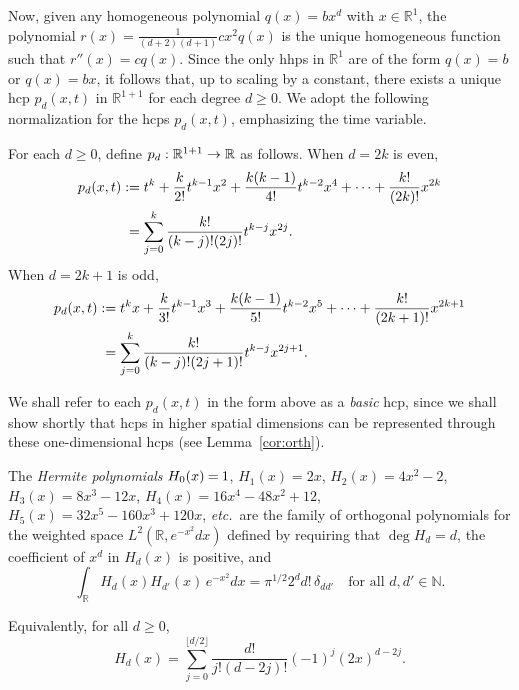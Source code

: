 \documentclass[AHL,Unicode,longabstracts,published]{cedram}
\newcommand{\N}{\mathbb{N}}
\newcommand{\R}{\mathbb{R}}
\newcommand*{\mk}{\mkern -1mu}
\newcommand*{\Mk}{\mkern -2mu}
\newcommand*{\MK}{\mkern 2mu}
\renewcommand*{\to}{\mathchoice{\longrightarrow}{\rightarrow}{\rightarrow}{\rightarrow}}
\newcommand{\R}{\mathbb{R}}
\begin{document}
Now, given any homogeneous polynomial $q(x)=bx^d$ with $x\in\R^1$, the polynomial $r(x)=\frac{1}{(d+2)(d+1)}cx^2q(x)$ is the unique homogeneous function such that $r''(x)=cq(x)$. Since the only hhps in $\R^1$ are of the form $q(x)=b$ or $q(x)=bx$, it follows that, up to scaling by a constant, there exists a unique hcp $p_d(x,t)$ in $\R^{1+1}$ for each degree $d\geq 0$. We adopt the following normalization for the hcps $p_d(x,t)$, emphasizing the time variable.

\begin{defi}\label{def:basic-p}
For each $d\geq 0$, define $p_d:\R^{1+1}\to\R$ as follows. When $d=2k$ is even,
\begin{align*}
p_{d}(x,t) \,\MK &\!\Mk:= t^k + \frac{k}{2!} t^{k-1} x^2 + \frac{k(k-1)}{4!} t^{k-2} x^4 + \dots + \frac{k!}{(2k)!} x^{2k} \\
&= \sum_{j=0}^k \frac{k!}{(k-j)! (2j)!} t^{k-j} x^{2j}.
\end{align*}
When $d=2k+1$ is odd,
\begin{align*}
p_{d}(x,t) \,\MK &\!\Mk:= t^k x + \frac{k}{3!} t^{k-1} x^3 + \frac{k(k-1)}{5!} t^{k-2} x^5 + \dots + \frac{k!}{(2k+1)!} x^{2k+1} \\
&= \sum_{j=0}^k \frac{k!}{(k-j)! (2j+1)!} t^{k-j} x^{2j+1}.
\end{align*}
\end{defi}

{We shall refer to each $p_d(x,t)$ in the form above as a \emph{basic} hcp, since we shall show shortly that hcps in higher spatial dimensions can be represented through these one-dimensional hcps (see Lemma~\ref{cor:orth}).}

\begin{defi}
\!\! The \emph{Hermite polynomials} ${H_0(x)\mk=\mk 1}$, $H_1(x)=2x$, $H_2(x)=4x^2-2$, $H_3(x)=8x^3-12x$, $H_4(x)=16x^4-48x^2+12$, $H_5(x)=32x^5-160x^3+120x$, \emph{etc.}~are the family of orthogonal polynomials for the weighted space $L^2(\R,e^{-x^2}dx)$ defined by requiring that $\deg H_d=d$, the coefficient of $x^d$ in $H_d(x)$ is positive, and
\begin{equation}\label{H-def}
\int_{\R} H_{d}(x)H_{d'}(x)\,e^{-x^2}dx=\pi^{1/2}2^d d!\,\delta_{dd'}\quad\text{for all }d,d'\in\N.
\end{equation}
\end{defi}

\begin{lemm}
Equivalently, for all $d\geq 0$,
\begin{equation}\label{H-expansion}
H_d(x)=\sum_{j=0}^{\lfloor d/2\rfloor} \frac{d!}{j!(d-2j)!}(-1)^j(2x)^{d-2j}.
\end{equation}
\end{lemm}
\end{document}
